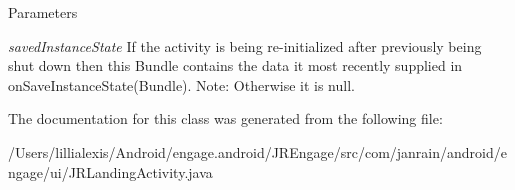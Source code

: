 \begin{DoxyParams}{Parameters}
\item[{\em savedInstanceState}]If the activity is being re-\/initialized after previously being shut down then this Bundle contains the data it most recently supplied in onSaveInstanceState(Bundle). Note: Otherwise it is null. \end{DoxyParams}


The documentation for this class was generated from the following file:\begin{DoxyCompactItemize}
\item 
/Users/lillialexis/Android/engage.android/JREngage/src/com/janrain/android/engage/ui/JRLandingActivity.java\end{DoxyCompactItemize}
